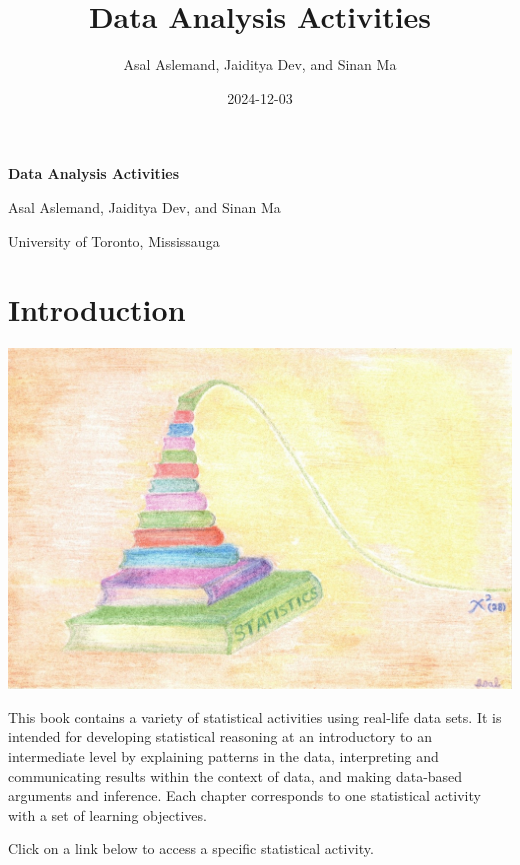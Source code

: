 \documentclass[oneside,openany]{book}
\title{Data Analysis Activities}
\author{Asal Aslemand, Jaiditya Dev, and Sinan Ma}
\date{2024-12-03}
\begin{document}
\begin{titlepage}
    \centering
    {\Huge \bfseries Data Analysis Activities\par}
    \vspace{2cm}
    {\Large Asal Aslemand, Jaiditya Dev, and Sinan Ma\par}
    {\Large University of Toronto, Mississauga}
    \vfill
\end{titlepage}

\newpage
{
\setcounter{tocdepth}{2}
\tableofcontents
}
\newpage
\chapter*{Introduction}


\begin{center}\includegraphics[width=0.65\linewidth]{Chi-square} \end{center}

This book contains a variety of statistical activities using real-life data sets. It is intended for developing statistical reasoning at an introductory to an intermediate level by explaining patterns in the data, interpreting and communicating results within the context of data, and making data-based arguments and inference. Each chapter corresponds to one statistical activity with a set of learning objectives.

Click on a link below to access a specific statistical activity.
\end{document}
